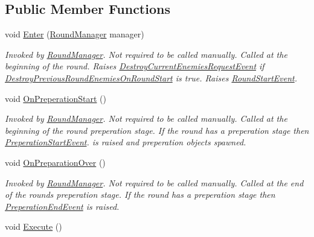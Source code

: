 \subsection*{Public Member Functions}
\begin{DoxyCompactItemize}
\item 
void \hyperlink{class_round_manager_1_1_round_a05eddb1c5682e5df7a137c0065b31592}{Enter} (\hyperlink{class_round_manager_1_1_round_manager}{Round\+Manager} manager)
\begin{DoxyCompactList}\small\item\em Invoked by \hyperlink{class_round_manager_1_1_round_manager}{Round\+Manager}. Not required to be called manually. Called at the beginning of the round. Raises \hyperlink{class_round_manager_1_1_events_1_1_destroy_current_enemies_request_event}{Destroy\+Current\+Enemies\+Request\+Event} if \hyperlink{class_round_manager_1_1_round_a037f0609ebfdf5eb6c72be5c9678761d}{Destroy\+Previous\+Round\+Enemies\+On\+Round\+Start} is true. Raises \hyperlink{class_round_manager_1_1_events_1_1_round_start_event}{Round\+Start\+Event}. \end{DoxyCompactList}\item 
void \hyperlink{class_round_manager_1_1_round_ad727354eb92066e2177679d0cf594c8b}{On\+Preperation\+Start} ()
\begin{DoxyCompactList}\small\item\em Invoked by \hyperlink{class_round_manager_1_1_round_manager}{Round\+Manager}. Not required to be called manually. Called at the beginning of the round preperation stage. If the round has a preperation stage then \hyperlink{class_round_manager_1_1_events_1_1_preperation_start_event}{Preperation\+Start\+Event}. is raised and preperation objects spawned. \end{DoxyCompactList}\item 
void \hyperlink{class_round_manager_1_1_round_ada26cc057fe381cf1178b8c711ba2bff}{On\+Preparation\+Over} ()
\begin{DoxyCompactList}\small\item\em Invoked by \hyperlink{class_round_manager_1_1_round_manager}{Round\+Manager}. Not required to be called manually. Called at the end of the rounds preperation stage. If the round has a preperation stage then \hyperlink{class_round_manager_1_1_events_1_1_preperation_end_event}{Preperation\+End\+Event} is raised. \end{DoxyCompactList}\item 
void \hyperlink{class_round_manager_1_1_round_a35ff12762642fe01634f326b53ea9a4b}{Execute} ()

\end{DoxyCompactItemize}
